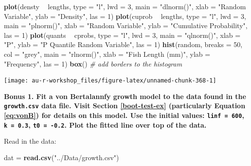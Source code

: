 \documentclass[]{book}
\newenvironment{Shaded}{\begin{snugshade}}{\end{snugshade}}
\newcommand{\KeywordTok}[1]{\textcolor[rgb]{0.13,0.29,0.53}{\textbf{#1}}}
\newcommand{\DataTypeTok}[1]{\textcolor[rgb]{0.13,0.29,0.53}{#1}}
\newcommand{\DecValTok}[1]{\textcolor[rgb]{0.00,0.00,0.81}{#1}}
\newcommand{\StringTok}[1]{\textcolor[rgb]{0.31,0.60,0.02}{#1}}
\newcommand{\CommentTok}[1]{\textcolor[rgb]{0.56,0.35,0.01}{\textit{#1}}}
\newcommand{\OperatorTok}[1]{\textcolor[rgb]{0.81,0.36,0.00}{\textbf{#1}}}
\newcommand{\NormalTok}[1]{#1}
\theoremstyle{definition}
\theoremstyle{definition}
\theoremstyle{definition}
\theoremstyle{remark}
\begin{document}
\begin{Shaded}
\begin{Highlighting}[]
\KeywordTok{plot}\NormalTok{(densty }\OperatorTok{~}\StringTok{ }\NormalTok{lengths, }\DataTypeTok{type =} \StringTok{"l"}\NormalTok{, }\DataTypeTok{lwd =} \DecValTok{3}\NormalTok{, }\DataTypeTok{main =} \StringTok{"dlnorm()"}\NormalTok{,}
     \DataTypeTok{xlab =} \StringTok{"Random Variable"}\NormalTok{, }\DataTypeTok{ylab =} \StringTok{"Density"}\NormalTok{, }\DataTypeTok{las =} \DecValTok{1}\NormalTok{)}
\KeywordTok{plot}\NormalTok{(cuprob }\OperatorTok{~}\StringTok{ }\NormalTok{lengths, }\DataTypeTok{type =} \StringTok{"l"}\NormalTok{, }\DataTypeTok{lwd =} \DecValTok{3}\NormalTok{, }\DataTypeTok{main =} \StringTok{"plnorm()"}\NormalTok{,}
     \DataTypeTok{xlab =} \StringTok{"Random Variable"}\NormalTok{, }\DataTypeTok{ylab =} \StringTok{"Cumulative Probability"}\NormalTok{, }\DataTypeTok{las =} \DecValTok{1}\NormalTok{)}
\KeywordTok{plot}\NormalTok{(quants }\OperatorTok{~}\StringTok{ }\NormalTok{cprobs, }\DataTypeTok{type =} \StringTok{"l"}\NormalTok{, }\DataTypeTok{lwd =} \DecValTok{3}\NormalTok{, }\DataTypeTok{main =} \StringTok{"qlnorm()"}\NormalTok{,}
     \DataTypeTok{xlab =} \StringTok{"P"}\NormalTok{, }\DataTypeTok{ylab =} \StringTok{"P Quantile Random Variable"}\NormalTok{, }\DataTypeTok{las =} \DecValTok{1}\NormalTok{)}
\KeywordTok{hist}\NormalTok{(random, }\DataTypeTok{breaks =} \DecValTok{50}\NormalTok{, }\DataTypeTok{col =} \StringTok{"grey"}\NormalTok{, }\DataTypeTok{main =} \StringTok{"rlnorm()"}\NormalTok{,}
     \DataTypeTok{xlab =} \StringTok{"Fish Length (mm)"}\NormalTok{, }\DataTypeTok{ylab =} \StringTok{"Frequency"}\NormalTok{, }\DataTypeTok{las =} \DecValTok{1}\NormalTok{)}
\KeywordTok{box}\NormalTok{() }\CommentTok{# add borders to the histogram}
\end{Highlighting}
\end{Shaded}

\begin{center}\texttt{[image: au-r-workshop\_files/figure-latex/unnamed-chunk-368-1]} \end{center}

\textbf{Bonus 1. Fit a von Bertalannfy growth model to the data found in
the \texttt{growth.csv} data file. Visit Section \ref{boot-test-ex}
(particularly Equation \eqref{eq:vonB}) for details on this model. Use the
initial values: \texttt{linf\ =\ 600}, \texttt{k\ =\ 0.3},
\texttt{t0\ =\ -0.2}. Plot the fitted line over top of the data.}

Read in the data:

\begin{Shaded}
\begin{Highlighting}[]
\NormalTok{dat =}\StringTok{ }\KeywordTok{read.csv}\NormalTok{(}\StringTok{"../Data/growth.csv"}\NormalTok{)}
\end{Highlighting}
\end{Shaded}
\end{document}
